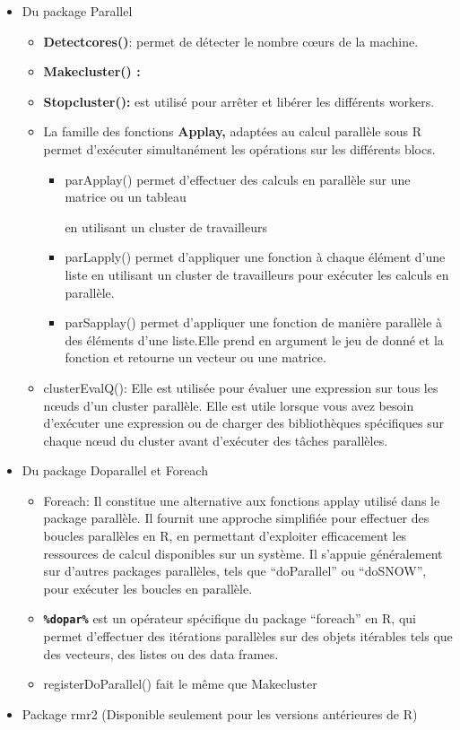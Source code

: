 \documentclass[
]{article}
\begin{document}
\begin{itemize}
\item
  Du package Parallel

  \begin{itemize}
  \item
    \textbf{Detectcores()}: permet de détecter le nombre cœurs de la
    machine.
  \item
    \textbf{Makecluster() :}
  \item
    \textbf{Stopcluster():} est utilisé pour arrêter et libérer les
    différents workers.
  \item
    La famille des fonctions \textbf{Applay,} adaptées au calcul
    parallèle sous R permet d'exécuter simultanément les opérations sur
    les différents blocs.

    \begin{itemize}
    \item
      parApplay() permet d'effectuer des calculs en parallèle sur une
      matrice ou un tableau

      en utilisant un cluster de travailleurs
    \item
      parLapply() permet d'appliquer une fonction à chaque élément d'une
      liste en utilisant un cluster de travailleurs pour exécuter les
      calculs en parallèle.
    \item
      parSapplay() permet d'appliquer une fonction de manière parallèle
      à des éléments d'une liste.Elle prend en argument le jeu de donné
      et la fonction et retourne un vecteur ou une matrice.
    \end{itemize}
  \item
    clusterEvalQ(): Elle est utilisée pour évaluer une expression sur
    tous les nœuds d'un cluster parallèle. Elle est utile lorsque vous
    avez besoin d'exécuter une expression ou de charger des
    bibliothèques spécifiques sur chaque nœud du cluster avant
    d'exécuter des tâches parallèles.
  \end{itemize}
\item
  Du package Doparallel et Foreach

  \begin{itemize}
  \item
    Foreach: Il constitue une alternative aux fonctions applay utilisé
    dans le package parallèle. Il fournit une approche simplifiée pour
    effectuer des boucles parallèles en R, en permettant d'exploiter
    efficacement les ressources de calcul disponibles sur un système. Il
    s'appuie généralement sur d'autres packages parallèles, tels que
    ``doParallel'' ou ``doSNOW'', pour exécuter les boucles en
    parallèle.
  \item
    \textbf{\texttt{\%dopar\%}} est un opérateur spécifique du package
    ``foreach'' en R, qui permet d'effectuer des itérations parallèles
    sur des objets itérables tels que des vecteurs, des listes ou des
    data frames.
  \item
    registerDoParallel() fait le même que Makecluster
  \end{itemize}
\item
  Package rmr2 (Disponible seulement pour les versions antérieures de R)


\end{itemize}
\end{document}
